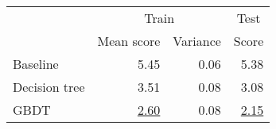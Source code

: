 \begin{tabular}{lrrr}
  \toprule
                & \multicolumn{2}{c}{Train} & \multicolumn{1}{c}{Test}
  \\
  \cmidrule(lr){2-4}

                & Mean score                & Variance                 & Score
  \\
  \midrule
  Baseline      & 5.45                      & 0.06                     & 5.38
  \\
  Decision tree & 3.51                      & 0.08                     & 3.08
  \\
  GBDT          & \underline{2.60}          & 0.08                     & \underline{2.15}
  \\
  \bottomrule
\end{tabular}
